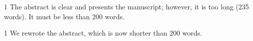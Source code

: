 \begin{reviewcomment}{1}
	The abstract is clear and presents the manuscript; however, it is too long (235 words). It must be less than 200 words.
\end{reviewcomment}

\begin{reviewresponse}{1}
	We rewrote the abstract, which is now shorter than $200$ words.

\end{reviewresponse}
